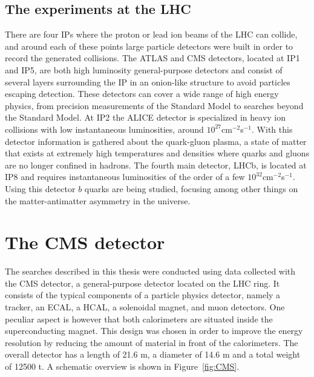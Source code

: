 \subsection{The experiments at the LHC}

There are four \acp{IP} where the proton or lead ion beams of the \ac{LHC} can collide, and around each of these points large particle detectors were built in order to record the generated collisions. The \acs{ATLAS} and \ac{CMS} detectors, located at \ac{IP}1 and \ac{IP}5, are both high luminosity general-purpose detectors and consist of several layers surrounding the \ac{IP} in an onion-like structure to avoid particles escaping detection. These detectors can cover a wide range of high energy physics, from precision measurements of the Standard Model to searches beyond the Standard Model. At \ac{IP}2 the \acs{ALICE} detector is specialized in heavy ion collisions with low instantaneous luminosities, around $10^{27}$cm$^{-2}$s$^{-1}$. With this detector information is gathered about the quark-gluon plasma, a state of matter that exists at extremely high temperatures and densities where quarks and gluons are no longer confined in hadrons. The fourth main detector, \acs{LHCb}, is located at \ac{IP}8 and requires instantaneous luminosities of the order of a few $10^{32}$cm$^{-2}$s$^{-1}$. Using this detector $b$ quarks are being studied, focusing among other things on the matter-antimatter asymmetry in the universe.

\section{The CMS detector} 
\label{sec:CMS}

The searches described in this thesis were conducted using data collected with the \ac{CMS} detector, a general-purpose detector located on the \ac{LHC} ring. It consists of the typical components of a particle physics detector, namely a tracker, an \ac{ECAL}, a \ac{HCAL}, a solenoidal magnet, and muon detectors. One peculiar aspect is however that both calorimeters are situated inside the superconducting magnet. This design was chosen in order to improve the energy resolution by reducing the amount of material in front of the calorimeters. The overall detector has a length of 21.6 m, a diameter of 14.6 m and a total weight of 12500 t. A schematic overview is shown in Figure~\ref{fig:CMS}.

